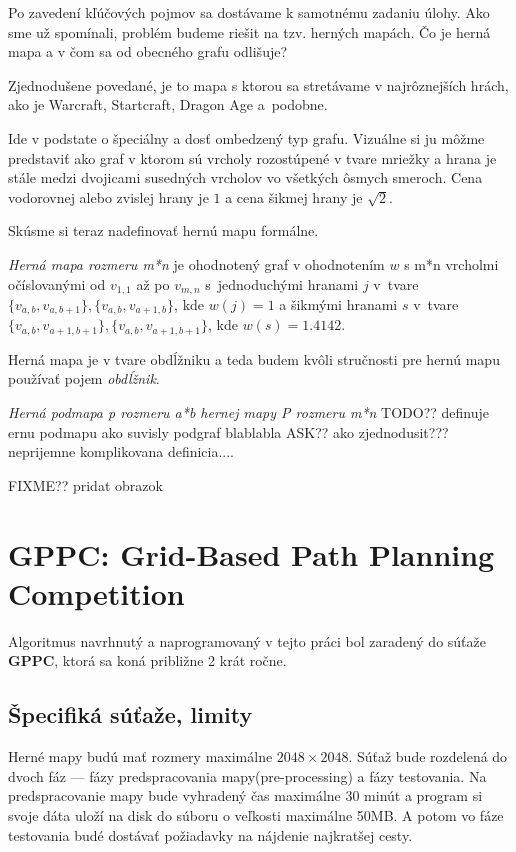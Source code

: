 Po zavedení kľúčových pojmov sa dostávame k samotnému zadaniu úlohy. 
Ako sme už spomínali, problém budeme riešit na tzv. herných mapách. Čo je herná mapa a v čom sa od obecného grafu odlišuje?

Zjednodušene povedané, je to mapa s ktorou sa stretávame v najrôznejších hrách, ako je Warcraft, Startcraft, Dragon Age
a~podobne.

Ide v podstate o špeciálny a dosť ombedzený typ grafu. Vizuálne si ju môžme predstaviť ako graf v ktorom sú vrcholy rozostúpené v tvare mriežky a hrana
je stále medzi dvojicami susedných vrcholov vo všetkých ôsmych smeroch. Cena vodorovnej alebo zvislej hrany je $1$ a cena šikmej hrany je $\sqrt{2}$.


Skúsme si teraz nadefinovať hernú mapu formálne.

\begin{define}
{\sl Herná mapa rozmeru m*n} je ohodnotený graf v ohodnotením $w$ s m*n vrcholmi očíslovanými od $v_{1,1}$ až po $v_{m,n}$ 
s~jednoduchými hranami $j$ v~tvare $\{v_{a,b}, v_{a,b+1}\}, \{v_{a,b}, v_{a+1,b}\}$, kde $w(j) = 1$ 
a šikmými hranami $ s $ v~tvare $\{v_{a,b}, v_{a+1,b+1}\}, \{v_{a,b}, v_{a+1,b+1}\}$, kde $ w(s) = 1.4142 $.
\end{define}

\begin{note}
	Herná mapa je v tvare obdĺžniku a teda budem kvôli stručnosti pre hernú mapu používať pojem {\sl obdĺžnik}.
\end{note}

\begin{define}
{\sl Herná podmapa p rozmeru a*b hernej mapy P rozmeru m*n} 
TODO?? definuje ernu podmapu ako suvisly podgraf blablabla ASK?? ako zjednodusit??? neprijemne komplikovana definicia....

\end{define}
FIXME?? pridat obrazok


\section{GPPC: Grid-Based Path Planning Competition}
Algoritmus navrhnutý a naprogramovaný v tejto práci bol zaradený do súťaže \textbf{GPPC}, ktorá sa koná približne 2 krát ročne.

\subsection{Špecifiká súťaže, limity}

Herné mapy budú mať rozmery maximálne $2048 \times 2048$.
Súťaž bude rozdelená do dvoch fáz --- fázy predspracovania mapy(pre-processing)
a fázy testovania. Na predspracovanie mapy bude vyhradený čas
maximálne 30 minút a program si svoje dáta uloží na disk do súboru o veľkosti maximálne 50MB.
A potom vo fáze testovania budé dostávať požiadavky na nájdenie najkratšej cesty.

